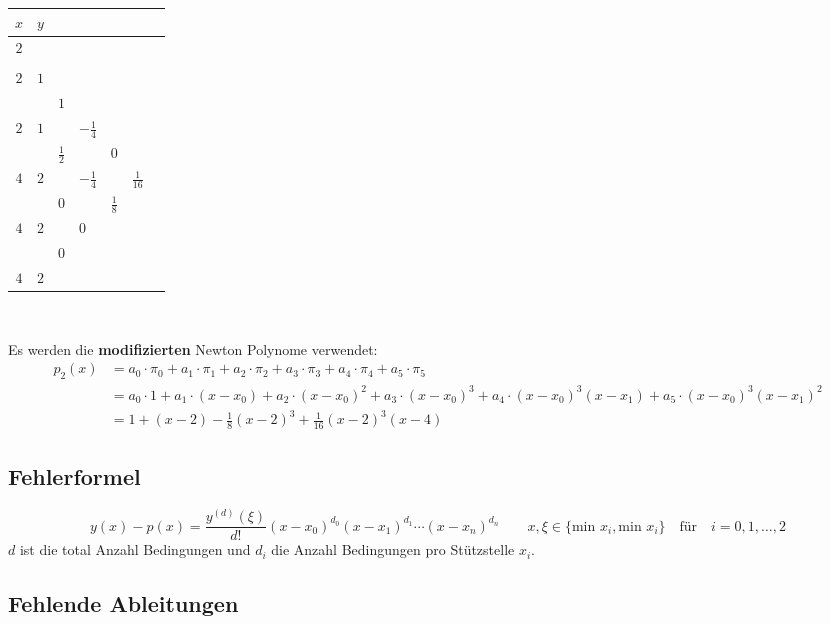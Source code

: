 \begin{minipage}{10cm} 
	\begin{tabular}{|c|llllll|}
		\hline
		$x$	&\multicolumn{6}{l|}{$y$}\\
		\hline
		$2$	&\kreisS{$1$}{$a_0$}&			&			&			&				&\\
			&		&\kreisS{$1$}{$a_1$}		&			&			&				&\\
		$2$	&$1$	&			&\kreisS{$0$}{$a_2$}		&			&				&\\
			&		&$1$		&			&\kreisM{$-\frac 18$}{$a_3$}&				&\\
		$2$	&$1$	&			&$-\frac 14$&			&\kreisM{$\frac 1{16}$}{$a_4$}	&\\
			&		&$\frac 12$	&			&$0$		&				&\kreisS{$0$}{$a_5$}\\
		$4$	&$2$	&			&$-\frac 14$&			&$\frac 1{16}$	&\\
			&		&$0$		&			&$\frac 18$	&				&\\
		$4$	&$2$	&			&$0$		&			&				&\\
			&		&$0$		&			&			&				&\\
		$4$	&$2$	&			&			&			&				&\\
		\hline
	\end{tabular}
\end{minipage}\\
\renewcommand{\arraystretch}{1.5}

Es werden die \textbf{modifizierten} Newton Polynome verwendet:
\begin{align}
p_2(x)	&=a_0\cdot \pi_0+a_1\cdot \pi_1+a_2\cdot \pi_2+a_3\cdot \pi_3+a_4\cdot \pi_4+a_5\cdot \pi_5\nonumber\\[0.3cm]
		&=a_0\cdot 1+a_1\cdot (x-x_0)+a_2\cdot (x-x_0)^2+a_3\cdot (x-x_0)^3+a_4\cdot (x-x_0)^3(x-x_1)+a_5\cdot (x-x_0)^3(x-x_1)^2\nonumber\\[0.3cm]
		&=1+(x-2)-\frac 18(x-2)^3+\frac 1{16} (x-2)^3(x-4)\nonumber
\end{align}

\subsection{Fehlerformel}

$$y(x)-p(x)=\frac{y^{(d)}(\xi)}{d!}(x-x_0)^{d_0}(x-x_1)^{d_1}\cdots (x-x_n)^{d_n}\qquad x,\xi \in \{\text{min } x_i,\text{min } x_i\}\quad\text{für}\quad i=0,1,\ldots,2$$
$d$ ist die total Anzahl Bedingungen und $d_i$ die Anzahl Bedingungen pro Stützstelle $x_i$.
\newpage

\subsection{Fehlende Ableitungen}

